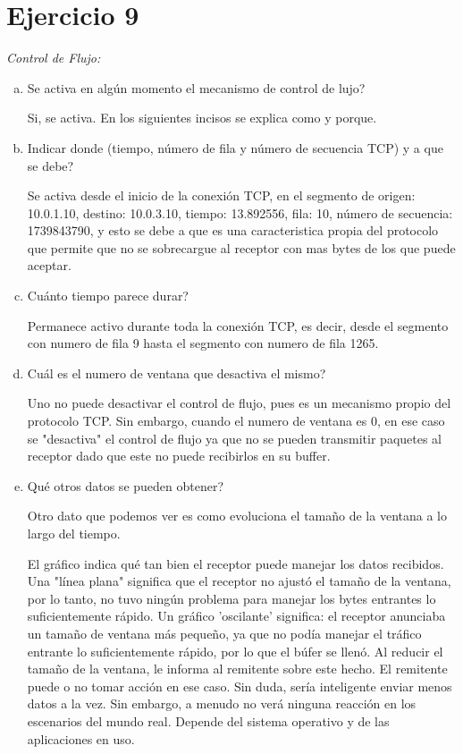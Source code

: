 \documentclass[osajnl,twocolumn,showpacs,superscriptaddress,10pt]{revtex4-1} %
\begin{document}
\section{Ejercicio 9}

\textit{Control de Flujo:}

\begin{enumerate}[a)]
    \item Se activa en algún momento el mecanismo de control de lujo?

    Si, se activa. En los siguientes incisos se explica como y porque.
   
    \item Indicar donde (tiempo, número de fila y número de secuencia TCP) y a que se debe?

    Se activa desde el inicio de la conexión TCP, en el segmento de origen: 10.0.1.10, destino: 10.0.3.10, tiempo: 13.892556, fila: 10, número de secuencia: 1739843790, y esto
    se debe a que es una caracteristica propia del protocolo que permite que no se sobrecargue al receptor con mas bytes de los que puede aceptar.    

    \item Cuánto tiempo parece durar?

    Permanece activo durante toda la conexión TCP, es decir, desde el segmento con numero de fila 9 hasta el segmento
    con numero de fila 1265.

    \item Cuál es el numero de ventana que desactiva el mismo?

    Uno no puede desactivar el control de flujo, pues es un mecanismo propio del protocolo TCP. Sin embargo, cuando el numero de ventana es 0, en ese caso se "desactiva" 
    el control de flujo ya que no se pueden transmitir paquetes al receptor dado que este no puede recibirlos en su buffer.

    \item Qué otros datos se pueden obtener?

    Otro dato que podemos ver es como evoluciona el tamaño de la ventana a lo largo del tiempo.

    El gráfico indica qué tan bien el receptor puede manejar los datos recibidos. Una "línea plana" significa que el receptor no ajustó el tamaño de la ventana, 
    por lo tanto, no tuvo ningún problema para manejar los bytes entrantes lo suficientemente rápido. Un gráfico 'oscilante' significa: el receptor anunciaba un 
    tamaño de ventana más pequeño, ya que no podía manejar el tráfico entrante lo suficientemente rápido, por lo que el búfer se llenó. Al reducir el tamaño de 
    la ventana, le informa al remitente sobre este hecho. El remitente puede o no tomar acción en ese caso. Sin duda, sería inteligente enviar menos datos a la vez. 
    Sin embargo, a menudo no verá ninguna reacción en los escenarios del mundo real. Depende del sistema operativo y de las aplicaciones en uso. \\


\end{enumerate}
\end{document}
